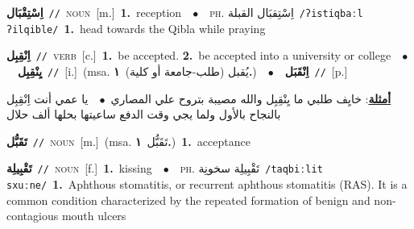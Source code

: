 \documentclass[10pt,a4paper,twoside]{article} %
\begin{document}
\begin{multicols}{2}
{{{{{{{{{\setlength\topsep{0pt}\textbf{\foreignlanguage{arabic}{اِسْتِقْبَال}}\ {\color{gray}\texttt{//}\color{black}}\ \textsc{noun}\ [m.]\ \textbf{1.}~reception\ \ $\bullet$\ \ \textsc{ph.} \color{gray} \foreignlanguage{arabic}{اِسْتِقبَال القبلة}\color{black}\ {\color{gray}\texttt{/{\sffamily ʔistiqbaːl ʔilqible}/}\color{black}}\ \textbf{1.}~head towards the Qibla while praying\ 

{\setlength\topsep{0pt}\textbf{\foreignlanguage{arabic}{اِنْقِبِل}}\ {\color{gray}\texttt{//}\color{black}}\ \textsc{verb}\ [c.]\ \textbf{1.}~be accepted.  \textbf{2.}~be accepted into a university or college\ \ $\bullet$\ \ \setlength\topsep{0pt}\textbf{\foreignlanguage{arabic}{يِنْقِبِل}}\ {\color{gray}\texttt{//}\color{black}}\ [i.]\ \color{gray}(msa. \foreignlanguage{arabic}{يُقبل (طلب-جامعة أو كلية)}~\foreignlanguage{arabic}{\textbf{١.}})\color{black}\ \ $\bullet$\ \ \setlength\topsep{0pt}\textbf{\foreignlanguage{arabic}{اِنْقَبَل}}\ {\color{gray}\texttt{//}\color{black}}\ [p.]\  \begin{flushright}\color{gray}\foreignlanguage{arabic}{\textbf{\underline{\foreignlanguage{arabic}{أمثلة}}}: خايِف طلبي ما يِنْقِبِل والله مصيبة بتروح علي المصاري\ $\bullet$\ \  يا عمي أنت اِنْقِبِل بالنجاح بالأول ولما يجي وقت الدفع ساعيتها بحلها ألف حلال}\end{flushright}\color{black}} \vspace{2mm}

{\setlength\topsep{0pt}\textbf{\foreignlanguage{arabic}{تَقَبُّل}}\ {\color{gray}\texttt{//}\color{black}}\ \textsc{noun}\ [m.]\ \color{gray}(msa. \foreignlanguage{arabic}{تَقَبُّل}~\foreignlanguage{arabic}{\textbf{١.}})\color{black}\ \textbf{1.}~acceptance\ 

{\setlength\topsep{0pt}\textbf{\foreignlanguage{arabic}{تَقْبِيلِة}}\ {\color{gray}\texttt{//}\color{black}}\ \textsc{noun}\ [f.]\ \textbf{1.}~kissing\ \ $\bullet$\ \ \textsc{ph.} \color{gray} \foreignlanguage{arabic}{تَقْبِيلِة سخونِة}\color{black}\ {\color{gray}\texttt{/{\sffamily taqbiːlit sxuːne}/}\color{black}}\ \textbf{1.}~Aphthous stomatitis, or recurrent aphthous stomatitis (RAS). It is a common condition characterized by the repeated formation of benign and non-contagious mouth ulcers\ 

}}}}}}}}}}}
\end{multicols}
\end{document}
